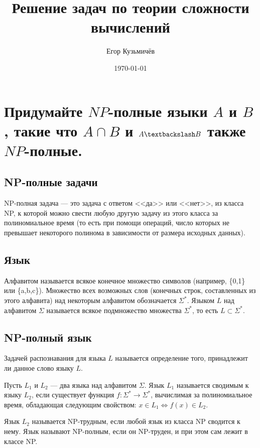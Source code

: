 \documentclass[a4paper,12pt]{article}
\author{Егор Кузьмичёв}
\title{Решение задач по теории сложности вычислений}
\date{\today}
\begin{document}

\maketitle


\section{Придумайте $NP$-полные языки $A$ и $B$, такие что $A\cap B$ и $A\textbackslash B$ также $NP$-полные.}

\subsection{NP-полные задачи}

NP-полная задача --- это задача с ответом <<да>> или <<нет>>, из класса NP, к которой можно свести любую другую задачу из этого класса за полиномиальное время (то есть при помощи операций, число которых не превышает некоторого полинома в зависимости от размера исходных данных).


\subsection{Язык}

Алфавитом называется всякое конечное множество символов (например, \{0,1\} или \{a,b,c\}). Множество всех возможных слов (конечных строк, составленных из этого алфавита) над некоторым алфавитом обозначается $\Sigma^*$. Языком $L$ над алфавитом $\Sigma$ называется всякое подмножество множества $\Sigma^*$, то есть $L\subset \Sigma^*$.

\subsection{NP-полный язык}
Задачей распознавания для языка $L$ называется определение того, принадлежит ли данное слово языку $L$.

Пусть $L_1$ и $L_2$ --- два языка над алфавитом $\Sigma$. Язык $L_1$ называется сводимым к языку $L_2$, если существует функция $f: \Sigma^*\to \Sigma^*$, вычислимая за полиномиальное время, обладающая следующим свойством:
$x\in L_1 \Leftrightarrow f(x)\in L_2$.

Язык $L_2$ называется NP-трудным, если любой язык из класса NP сводится к нему. Язык называют NP-полным, если он NP-труден, и при этом сам лежит в классе NP.
\end{document}
